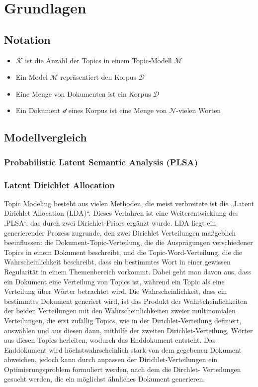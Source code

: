 \documentclass[german,version-2020-11]{uzl-thesis}
\begin{document}
\chapter{Grundlagen}%


\section{Notation}

\begin{itemize}
	\item $\mathcal{K}$ ist die Anzahl der Topics in einem Topic-Modell $\mathcal{M}$
	\item Ein Model $\mathcal{M}$ repräsentiert den Korpus $\mathcal{D}$
	\item Eine Menge von Dokumenten ist ein Korpus $\mathcal{D}$
	\item Ein Dokument $\mathcal{d}$ eines Korpus ist eine Menge von $\mathcal{N}$-vielen 
	Worten 
\end{itemize}


\section{Modellvergleich}
\subsection{Probabilistic Latent Semantic Analysis (PLSA)}


\subsection{Latent Dirichlet Allocation}
Topic Modeling besteht aus vielen Methoden, die meist verbreitete ist die „Latent Dirichlet Allocation (LDA)“.  Dieses Verfahren ist eine Weiterentwicklung des ‚PLSA‘, das durch zwei Dirichlet-Priors ergänzt wurde. LDA liegt ein generierender Prozess zugrunde, den zwei Dirichlet Verteilungen maßgeblich beeinflussen: die Dokument-Topic-Verteilung, die die Ausprägungen verschiedener Topics in einem Dokument beschreibt, und die Topic-Word-Verteilung, die die Wahrscheinlichkeit beschreibt, dass ein bestimmtes Wort in einer gewissen Regularität in einem Themenbereich vorkommt. Dabei geht man davon aus, dass ein Dokument eine Verteilung von Topics ist, während ein Topic als eine Verteilung über Wörter betrachtet wird. 
Die Wahrscheinlichkeit, dass ein bestimmtes Dokument generiert wird, ist das Produkt der Wahrscheinlichkeiten der beiden Verteilungen mit den Wahrscheinlichkeiten zweier multinomialen Verteilungen, die erst zufällig Topics, wie in der Dirichlet-Verteilung definiert, auswählen und aus diesen dann, mithilfe der zweiten Dirichlet-Verteilung, Wörter aus diesen Topics herleiten, wodurch das Enddokument entsteht. Das Enddokument wird höchstwahrscheinlich stark von dem gegebenen Dokument abweichen, jedoch kann durch anpassen der Dirichlet-Verteilungen ein Optimierungsproblem formuliert werden, nach dem die Dirchlet- Verteilungen gesucht werden, die ein möglichst ähnliches Dokument generieren.
\end{document}
